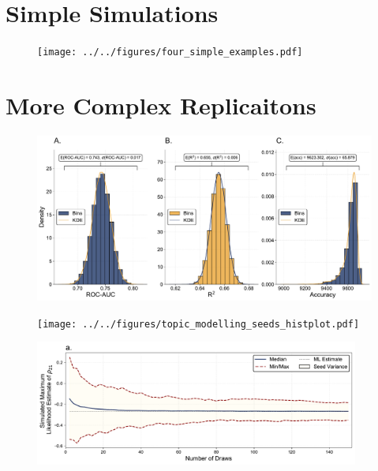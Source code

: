 \documentclass[12pt]{beamer}
\begin{document}
\section{Simple Simulations}
\begin{frame}
\begin{center}
\begin{figure}
	\texttt{[image: ../../figures/four\_simple\_examples.pdf]}
\end{figure}
\end{center}
\end{frame}

\section{More Complex Replicaitons}
\begin{frame}
\begin{center}
\begin{figure}
	\includegraphics[width=\textwidth]{../../figures/prediction_seeds.pdf}
\end{figure}
\end{center}
\end{frame}

\begin{frame}
\begin{center}
\begin{figure}
	\texttt{[image: ../../figures/topic\_modelling\_seeds\_histplot.pdf]}
\end{figure}
\end{center}
\end{frame}

\begin{frame}
\begin{center}
\begin{figure}
	\includegraphics[width=0.95\textwidth]{../../figures/mvprobit.pdf}
\end{figure}
\end{center}
\end{frame}
\end{document}
